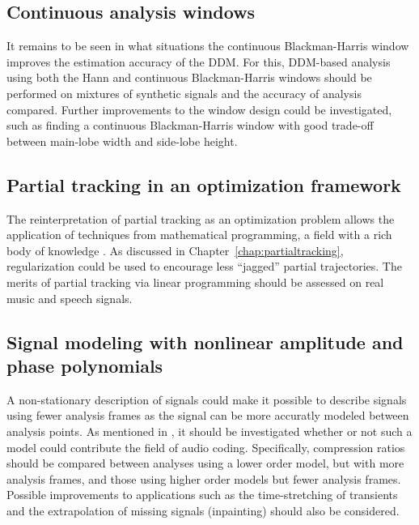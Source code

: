 \subsection{Continuous analysis windows}

It remains to be seen in what situations the continuous Blackman-Harris window
improves the estimation accuracy of the DDM. For this, DDM-based analysis using
both the Hann and continuous Blackman-Harris windows should
be performed on mixtures of synthetic signals and the accuracy of
analysis compared. Further improvements to the window design could be
investigated, such as finding a continuous Blackman-Harris window with good
trade-off between main-lobe width and side-lobe height.

\subsection{Partial tracking in an optimization framework}

The reinterpretation of partial tracking as an optimization problem allows the
application of techniques from mathematical programming, a field with
a rich body of knowledge \cite{boyd2004convex}. As discussed in
Chapter~\ref{chap:partialtracking}, regularization could be used to encourage
less ``jagged'' partial trajectories. The merits of partial tracking via
linear programming should be assessed on real music and speech signals.

\subsection{Signal modeling with nonlinear amplitude and phase polynomials}

A non-stationary description of signals could make it possible to describe
signals using fewer analysis frames as the signal can be more accuratly modeled
between analysis points. As mentioned in \cite{betser2009sinusoidal}, it should
be investigated whether or not such a model could contribute the field of audio
coding. Specifically, compression ratios should be compared between analyses
using a lower order model, but with more analysis frames, and those using higher order
models but fewer analysis frames. Possible improvements to applications such as
the time-stretching of transients and the extrapolation of missing signals
(inpainting) should also be considered.
